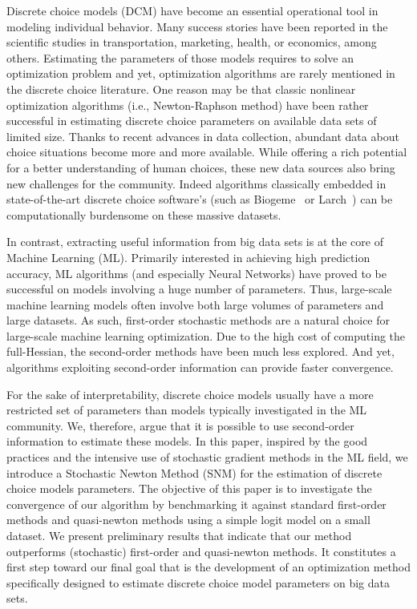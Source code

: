 \documentclass[conference]{IEEEtran}
\begin{document}
Discrete choice models (DCM) have become an essential operational tool in modeling individual behavior. Many success stories have been reported in the scientific studies in transportation, marketing, health, or economics, among others. Estimating the parameters of those models requires to solve an optimization problem and yet, optimization algorithms are rarely mentioned in the discrete choice literature. One reason may be that classic nonlinear optimization algorithms (i.e., Newton-Raphson method) have been rather successful in estimating discrete choice parameters on available data sets of limited size. Thanks to recent advances in data collection, abundant data about choice situations become more and more available. While offering a rich potential for a better understanding of human choices, these new data sources also bring new challenges for the community. Indeed algorithms classically embedded in state-of-the-art discrete choice software's (such as Biogeme~\cite{bierlaire_biogeme:_2003} or Larch~\cite{newman_computational_2018}) can be computationally burdensome on these massive datasets. 

In contrast, extracting useful information from big data sets is at the core of Machine Learning (ML). Primarily interested in achieving high prediction accuracy, ML algorithms (and especially Neural Networks)  have proved to be successful on models involving a huge number of parameters. Thus, large-scale machine learning models often involve both large volumes of parameters and large datasets. As such, first-order stochastic methods are a natural choice for large-scale machine learning optimization.  Due to the high cost of computing the full-Hessian, the second-order methods have been much less explored. And yet, algorithms exploiting second-order information can provide faster convergence. 

For the sake of interpretability, discrete choice models usually have a more restricted set of parameters than models typically investigated in the ML community. We, therefore, argue that it is possible to use second-order information to estimate these models. In this paper, inspired by the good practices and the intensive use of stochastic gradient methods in the ML field, we introduce a Stochastic Newton Method (SNM) for the estimation of discrete choice models parameters. The objective of this paper is to investigate the convergence of our algorithm by benchmarking it against standard first-order methods and quasi-newton methods using a simple logit model on a small dataset. We present preliminary results that indicate that our method outperforms (stochastic) first-order and quasi-newton methods. It constitutes a first step toward our final goal that is the development of an optimization method specifically designed to estimate discrete choice model parameters on big data sets.
\end{document}
